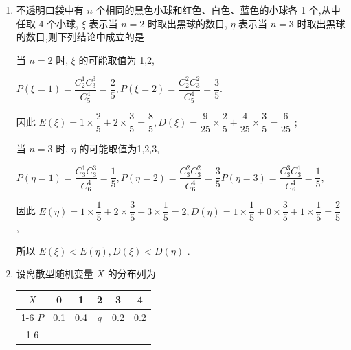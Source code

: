 \begin{enumerate}
\begin{enumerate}
\begin{jieda}
            $\therefore \sqrt{D\left( X\right) } = \dfrac{\sqrt{149}}{18}$ .
        \end{jieda}
        \item 不透明口袋中有 $n$ 个相同的黑色小球和红色、白色、蓝色的小球各 1 个,从中任取 4 个小球, $\xi$ 表示当 $n = 2$ 时取出黑球的数目, $\eta$ 表示当 $n = 3$ 时取出黑球的数目,则下列结论中成立的是
        \begin{jieda}
            当 $n = 2$ 时, $\xi$ 的可能取值为 1,2,
            
            $P\left( {\xi  = 1}\right)  = \dfrac{C_{2}^{1}C_{3}^{3}}{C_{5}^{4}} = \dfrac{2}{5},P\left( {\xi  = 2}\right)  = \dfrac{C_{2}^{2}C_{3}^{2}}{C_{5}^{4}} = \dfrac{3}{5}.$
            
            因此 $E\left( \xi \right)  = 1 \times  \dfrac{2}{5} + 2 \times  \dfrac{3}{5} = \dfrac{8}{5},D\left( \xi \right)  = \dfrac{9}{25} \times  \dfrac{2}{5} + \dfrac{4}{25} \times  \dfrac{3}{5} = \dfrac{6}{25}$ ;
            
            当 $n = 3$ 时, $\eta$ 的可能取值为1,2,3,
            
            $P\left( {\eta  = 1}\right)  = \dfrac{C_{3}^{1}C_{3}^{3}}{C_{6}^{4}} = \dfrac{1}{5},P\left( {\eta  = 2}\right)  = \dfrac{C_{3}^{2}C_{3}^{2}}{C_{6}^{4}} = \dfrac{3}{5}P\left( {\eta  = 3}\right)  = \dfrac{C_{3}^{3}C_{3}^{1}}{C_{6}^{4}} = \dfrac{1}{5},$
            
            因此 $E\left( \eta \right)  = 1 \times  \dfrac{1}{5} + 2 \times  \dfrac{3}{5} + 3 \times  \dfrac{1}{5} = 2,D\left( \eta \right)  = 1 \times  \dfrac{1}{5} + 0 \times  \dfrac{3}{5} + 1 \times  \dfrac{1}{5} = \dfrac{2}{5}$ ,
            
            所以 $E\left( \xi \right)  < E\left( \eta \right) ,D\left( \xi \right)  < D\left( \eta \right)$ .
        \end{jieda}
        \item 设离散型随机变量 $X$ 的分布列为
        
        \begin{center}
        
        \begin{tabular}{|c|c|c|c|c|c|}
        \hline
        $X$ & 0 & 1 & 2 & 3 & 4 \\
        \cline{1-6}
        $P$ & 0.1 & 0.4 & $q$ & 0.2 & 0.2 \\
        \cline{1-6}
        \hline
        \end{tabular}
        

\end{center}
\end{enumerate}
\end{enumerate}
